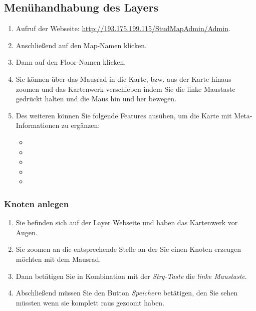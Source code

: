 \subsection*{Menühandhabung des Layers}
\begin{enumerate}
\item Aufruf der Webseite: \href{URL}{http://193.175.199.115/StudMapAdmin/Admin}. 
\item Anschließend auf den Map-Namen klicken.
\item Dann auf den Floor-Namen klicken.
\item Sie können über das Mausrad in die Karte, bzw. aus der Karte hinaus zoomen und das Kartenwerk verschieben indem Sie die linke Maustaste gedrückt halten und die Maus hin und her bewegen.
\item Des weiteren können Sie folgende Features ausüben, um die Karte mit Meta-Informationen zu ergänzen:
	\begin{itemize}
	\item {}
	\item {}
	\item {}
	\item {}
	\item {}
	\end{itemize} 
\end{enumerate}

\subsubsection*{Knoten anlegen}
\label{Knoten anlegen}
\begin{enumerate}
\item Sie befinden sich auf der Layer Webseite und haben das Kartenwerk vor Augen.
\item Sie zoomen an die entsprechende Stelle an der Sie einen Knoten erzeugen möchten mit dem Mausrad.
\item Dann betätigen Sie in Kombination mit der \textit{Strg-Taste} die \textit{linke Maustaste}.
\item Abschließend müssen Sie den Button \textit{Speichern} betätigen, den Sie sehen müssten wenn sie komplett raus gezoomt haben.
\end{enumerate}
